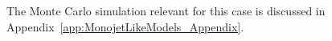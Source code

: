 


% 

The Monte Carlo simulation relevant for
this case is discussed in Appendix~\ref{app:MonojetLikeModels_Appendix}.




